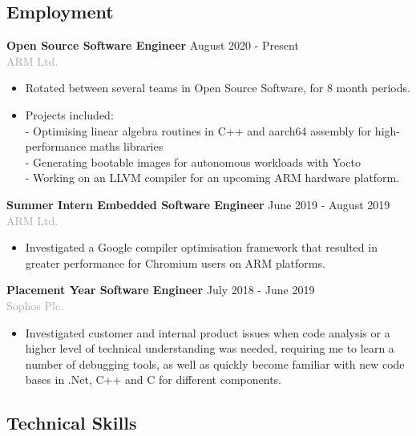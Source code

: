 \documentclass[11pt]{article}
\newcommand{\dash}{\item[-]}
\newcommand{\linesep}{\noindent\makebox[\linewidth]{\rule{\linewidth}{0.2pt}}}
\begin{document}
 \subsection*{Employment}
\textbf{Open Source Software Engineer} \hfill August 2020 - Present \\
\textcolor{darkgray}{ARM Ltd.}
  \begin{itemize}
   \dash Rotated between several teams in Open Source Software, for 8 month periods. 
   \dash Projects included: \\ -  Optimising linear algebra routines in C++ and aarch64 assembly for high-performance maths libraries
\\ -  Generating bootable images for autonomous workloads with Yocto
\\ -  Working on an LLVM compiler for an upcoming ARM hardware platform.
  \end{itemize}
\vspace{10pt}
\textbf{Summer Intern Embedded Software Engineer} \hfill June 2019 - August 2019 \\
\textcolor{darkgray}{ARM Ltd.}
  \begin{itemize}
   \dash Investigated a Google compiler optimisation framework that resulted in greater performance for Chromium users on ARM platforms.
  \end{itemize}
\vspace{10pt}
\textbf{Placement Year Software Engineer} \hfill July 2018 - June 2019 \\
\textcolor{darkgray}{Sophos Plc.}
  \begin{itemize}
   \dash Investigated customer and internal product issues when code analysis or a higher level of technical understanding was needed, requiring me to learn a number of debugging tools, as well as quickly become familiar with new code bases in .Net, C++ and C for different components.
  \end{itemize}

  \linesep

  \subsection*{Technical Skills}
   \renewcommand\tabularxcolumn[1]{b{#1}}%
\end{document}
